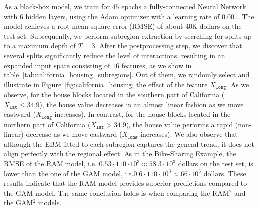 \documentclass[12pt]{article}
\begin{document}
As a black-box model, we train for $45$ epochs a fully-connected Neural Network with 6 hidden layers,
using the Adam optimizer with a learning rate of $0.001$.
The model achieves a root mean square error (RMSE) of about \(40\)K dollars on the test set.
Subsequently, we perform subregion extraction by searching for splits up to a maximum depth of \(T=3\).
After the postprocessing step, we discover that several splits significantly reduce the level of interactions,
resulting in an expanded input space consisting of \(16\) features, as we show in table~\ref{tab:california_housing_subregions}.
Out of them, we randomly select and illustrate in Figure~\ref{fig:california_housing} the effect of the feature $X_{\mathtt{long}}$.
As we observe, for the house blocks located in the southern part of California ($X_{\mathtt{lat}} \leq 34.9$),
the house value decreases in an almost linear fashion as we move eastward ($X_{\mathtt{long}}$ increases).
In contrast, for the house blocks located in the northern part of California ($X_{\mathtt{lat}} > 34.9$),
the house value performs a rapid (non-linear) decrease as we move eastward ($X_{\mathtt{long}}$ increases).
We also observe that although the EBM fitted to each subregion captures the general trend,
it does not align perfectly with the regional effect.
As in the Bike-Sharing Example, the RMSE of the RAM model, i.e. \( 0.53 \cdot 110 \cdot 10^3 \approx 58.3 \cdot 10^3\) dollars on the test set,
is lower than the one of the GAM model, i.e.\( 0.6 \cdot 110 \cdot 10^3 \approx 66 \cdot 10^3\) dollars.
These results indicate that the RAM model provides superior predictions compared to the GAM model.
The same conclusion holds is when comparing the RAM$^2$ and the GAM$^2$ models.
\end{document}
